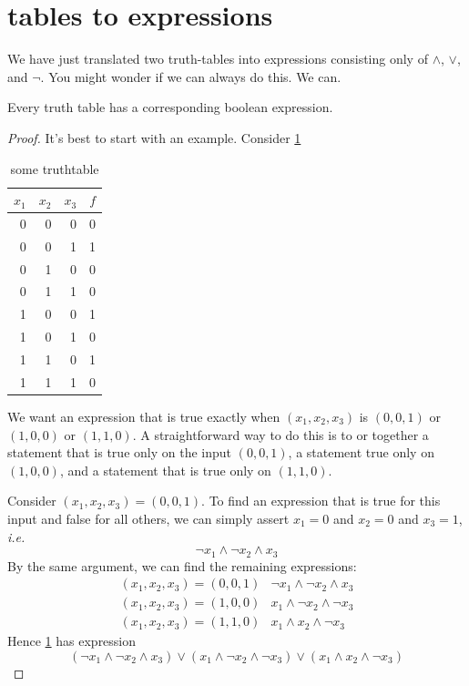 \documentclass{scrbook}
\begin{document}
\section[Tables to Expressions]{tables to expressions}
We have just translated two truth-tables into expressions consisting only of $\wedge$, $\vee$, and $\neg$. You might wonder if we can always do this. We can. 
\begin{theorem}[completeness]
  Every truth table has a corresponding boolean expression.
\end{theorem}
\begin{proof}
  It's best to start with an example. Consider \cref{tt:complete}
  \begin{table}[h!]
    \centering
  \caption{some truthtable}\label{tt:complete}
\begin{tabular}{rrrr}
$x_1$ & $x_2$ & $x_3$ & $f$ \\
\hline
0 & 0 & 0 & 0 \\
\rowcolor{LightCyan} 0 & 0 & 1 & 1 \\
0 & 1 & 0 & 0 \\
0 & 1 & 1 & 0 \\
\rowcolor{LightCyan} 1 & 0 & 0 & 1 \\
1 & 0 & 1 & 0 \\
\rowcolor{LightCyan} 1 & 1 & 0 & 1 \\
1 & 1 & 1 & 0 
\end{tabular}
\end{table}
We want an expression that is true exactly when $(x_1,x_2,x_3)$ is $(0,0,1)$ or $(1,0,0)$ or $(1,1,0)$. A straightforward way to do this is to or together a statement that is true only on the input $(0,0,1)$, a statement true only on $(1,0,0)$, and a statement that is true only on $(1,1,0)$. 

Consider $(x_1,x_2,x_3)=(0,0,1)$. To find an expression that is true for this input and false for all others, we can simply assert $x_1=0$ and $x_2=0$ and $x_3=1$, \emph{i.e.}
\[
\neg x_1\wedge \neg x_2 \wedge x_3
\]
By the same argument, we can find the remaining expressions:
\[
\begin{matrix}
 (x_1,x_2,x_3)=(0,0,1) & \neg x_1 \wedge \neg x_2 \wedge x_3 \\
 (x_1,x_2,x_3)=(1,0,0) & x_1 \wedge \neg x_2 \wedge \neg x_3 \\
 (x_1,x_2,x_3)=(1,1,0) & x_1 \wedge x_2 \wedge \neg x_3 
\end{matrix}
\]
Hence \cref{tt:complete} has expression 
\[
(\neg x_1 \wedge \neg x_2 \wedge x_3 ) \vee (x_1 \wedge \neg x_2 \wedge \neg x_3) \vee  (x_1 \wedge x_2 \wedge \neg x_3)
\]


\end{proof}
\end{document}
